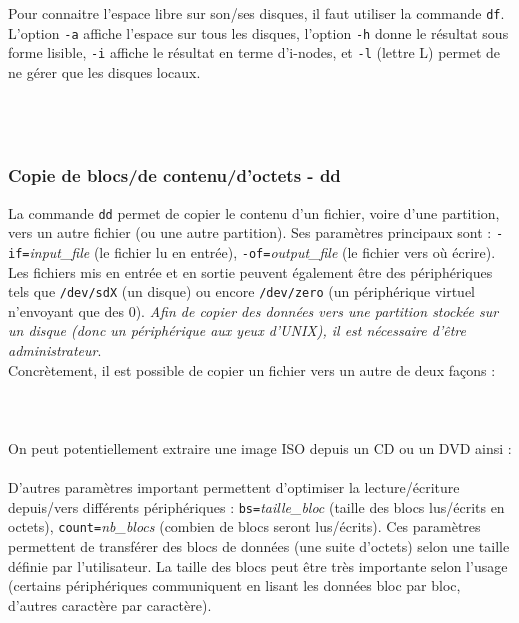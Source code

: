 Pour connaitre l'espace libre sur son/ses disques, il faut utiliser la commande \texttt{df}.
L'option \texttt{-a} affiche l'espace sur tous les disques, l'option \texttt{-h} donne le résultat sous forme lisible, \texttt{-i} affiche le résultat en terme d'i-nodes, et \texttt{-l} (lettre L) permet de ne gérer que les disques locaux.\\

\\
\\
\\

\bigskip

\subsubsection{Copie de blocs/de contenu/d'octets - dd}

\bigskip

La commande \texttt{dd} permet de copier le contenu d'un fichier, voire d'une partition, vers un autre fichier (ou une autre partition).
Ses paramètres principaux sont : \texttt{-if=}\textit{input\_file} (le fichier lu en entrée), \texttt{-of=}\textit{output\_file} (le fichier vers où écrire).
Les fichiers mis en entrée et en sortie peuvent également être des périphériques tels que \texttt{/dev/sdX} (un disque) ou encore \texttt{/dev/zero} (un périphérique virtuel n'envoyant que des $ 0 $).
\textit{Afin de copier des données vers une partition stockée sur un disque (donc un périphérique aux yeux d'UNIX), il est nécessaire d'être administrateur}.\\

Concrètement, il est possible de copier un fichier vers un autre de deux façons :\\

\\
\\
\\

On peut potentiellement extraire une image ISO depuis un CD ou un DVD ainsi :\\

\\

D'autres paramètres important permettent d'optimiser la lecture/écriture depuis/vers différents périphériques : \texttt{bs=}\textit{taille\_bloc} (taille des blocs lus/écrits en octets), \texttt{count=}\textit{nb\_blocs} (combien de blocs seront lus/écrits).
Ces paramètres permettent de transférer des blocs de données (une suite d'octets) selon une taille définie par l'utilisateur.
La taille des blocs peut être très importante selon l'usage (certains périphériques communiquent en lisant les données bloc par bloc, d'autres caractère par caractère).\\


